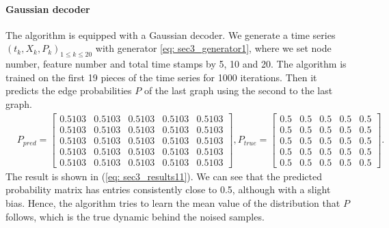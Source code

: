 \paragraph{Gaussian decoder}
The algorithm is equipped with a Gaussian decoder. 
We generate a time series $(t_k, X_k, P_k)_{1\leq k\leq 20}$ with generator \ref{eq: sec3_generator1}, 
where we set node number, feature number and total time stamps by 5, 10 and 20.
The algorithm is trained on the first 19 pieces of the time series for 1000 iterations. 
Then it predicts the edge probabilities $P$ of the last graph using the second to the last graph. 
\begin{align}
    \label{eq: sec3_results11}
    &P_{pred}=\begin{bmatrix}
        0.5103& 0.5103& 0.5103& 0.5103& 0.5103 \\
        0.5103& 0.5103& 0.5103& 0.5103& 0.5103 \\
        0.5103& 0.5103& 0.5103& 0.5103& 0.5103 \\
        0.5103& 0.5103& 0.5103& 0.5103& 0.5103 \\
        0.5103& 0.5103& 0.5103& 0.5103& 0.5103
    \end{bmatrix},
    P_{true}=\begin{bmatrix}
        0.5& 0.5& 0.5& 0.5& 0.5 \\
        0.5& 0.5& 0.5& 0.5& 0.5 \\
        0.5& 0.5& 0.5& 0.5& 0.5 \\
        0.5& 0.5& 0.5& 0.5& 0.5 \\
        0.5& 0.5& 0.5& 0.5& 0.5        
    \end{bmatrix}.
\end{align} 
The result is shown in (\ref{eq: sec3_results11}).
We can see that the predicted probability matrix has entries consistently close to 0.5, 
although with a slight bias.
Hence, the algorithm tries to learn the mean value of the distribution that $P$ follows, 
which is the true dynamic behind the noised samples.

